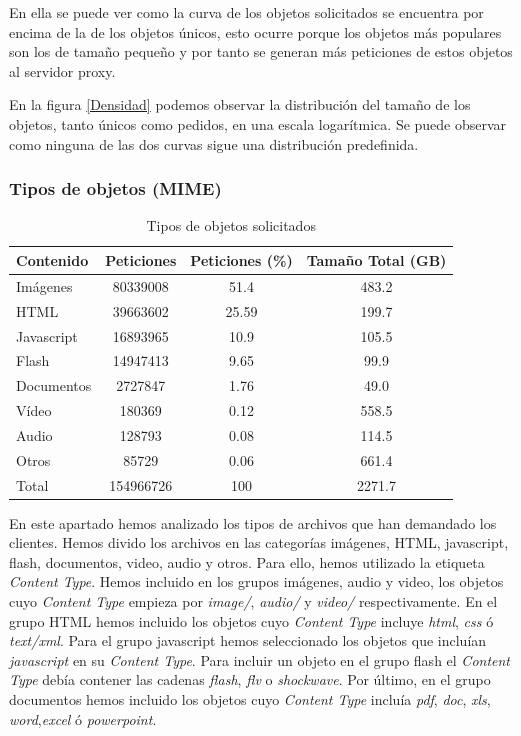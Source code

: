 \documentclass[twocolumn,twoside]{Jornadas}
\begin{document}
En ella se puede ver como la curva de los objetos solicitados se encuentra por encima de la de los objetos únicos, esto ocurre porque los objetos más populares son los de tamaño pequeño y por tanto se generan más peticiones de estos objetos al servidor proxy. 

En la figura \ref{Densidad} podemos observar la distribución del tamaño de los objetos, tanto únicos como pedidos, en una escala logarítmica. Se puede observar como ninguna de las dos curvas sigue una distribución predefinida.

\subsubsection{Tipos de objetos (MIME)}
\label{mime}

\begin{table}[ht!]
\centering
\renewcommand{\baselinestretch}{1.5}
\scriptsize
\begin{tabular}{|l||c|c|c|} \hline
Contenido   & Peticiones & Peticiones (\%) &Tamaño Total (GB) \\\hline\hline
Imágenes    & 80339008   & 51.4 &483.2             \\\hline  
HTML        & 39663602   & 25.59 &199.7             \\\hline 
Javascript  & 16893965   & 10.9 &105.5             \\\hline 
Flash       & 14947413   & 9.65 & 99.9              \\\hline 
Documentos  & 2727847    & 1.76 &49.0              \\\hline
Vídeo       & 180369     & 0.12 & 558.5             \\\hline 
Audio       & 128793     & 0.08 & 114.5             \\\hline 
Otros       & 85729      & 0.06 & 661.4             \\\hline\hline
Total & 154966726 & 100 & 2271.7 \\\hline
\end{tabular}
\caption{Tipos de objetos solicitados}
\label{table:contenido}
\end{table}

En este apartado hemos analizado los tipos de archivos que han demandado los clientes. Hemos divido los archivos en las categorías imágenes, HTML, javascript, flash, documentos, video, audio y otros. Para ello, hemos utilizado la etiqueta \emph{Content Type}. Hemos incluido en los grupos imágenes, audio y video, los objetos cuyo \emph{Content Type} empieza por \textit{image/}, \textit{audio/} y \textit{video/} respectivamente. En el grupo HTML hemos incluido los objetos cuyo \emph{Content Type} incluye \textit{html}, \textit{css} ó \textit{text/xml}. Para el grupo javascript hemos seleccionado los objetos que incluían \textit{javascript} en su \emph{Content Type}. Para incluir un objeto en el grupo flash el \emph{Content Type} debía contener las cadenas \textit{flash}, \textit{flv} o \textit{shockwave}. Por último, en el grupo documentos hemos incluido los objetos cuyo \emph{Content Type} incluía \textit{pdf}, \textit{doc}, \textit{xls}, \textit{word},\textit{excel} ó \textit{powerpoint}.
\end{document}
